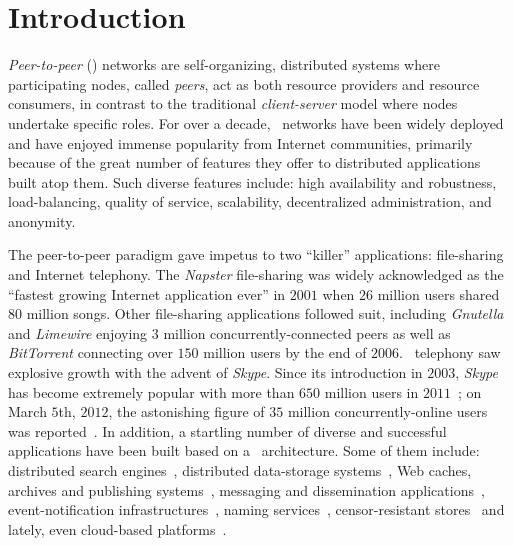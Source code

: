 \section{Introduction}
\label{section:intro}

\emph{Peer-to-peer} (\p) networks are self-organizing, distributed systems where
participating nodes, called \emph{peers}, act as both resource providers and
resource consumers, in contrast to the traditional \emph{client-server} model
where nodes undertake specific roles.
For over a decade, \p\ networks have been widely deployed and have
enjoyed immense popularity from Internet communities, primarily because
of the great number of features they offer to distributed applications 
built atop them. 
Such diverse features include:  high availability and robustness,
load-balancing, quality of service, scalability, decentralized administration,
and anonymity. 

The peer-to-peer paradigm gave impetus to two ``killer'' applications:
file-sharing and Internet telephony.
The {\sl Napster} file-sharing was widely acknowledged as the 
``fastest growing Internet application ever'' in $2001$ when
$26$ million users shared $80$ million songs.
Other file-sharing applications followed suit, 
including {\sl Gnutella} and {\sl Limewire} enjoying $3$ 
million concurrently-connected peers as well as 
{\sl BitTorrent} connecting over $150$ million users by the end of $2006$.
\p\ telephony saw explosive growth with the advent of {\sl Skype}.
Since its introduction in $2003$,
{\sl Skype} has become extremely popular with more than $650$ million users 
in $2011$~\cite{skypetotalusers}; on March $5$th, $2012$,  
the astonishing figure of $35$ million concurrently-online users  
was reported~\cite{skypesymusers}.
In addition, a startling number of diverse and successful
applications have been built based on a \p\ architecture. 
Some of them include:
distributed search engines~\cite{yaci}, 
distributed data-storage systems~\cite{kbc_oceanstore_2000,bdet_fsdfs_2000,dkkms_cfs_2001,dr_pastutility_2001,abc_farsite_2002,mmfc_ivy_2002,arla,agebh_dks_2003},
Web caches, archives and publishing systems~\cite{ird_squirrel_2002,bags_youserv_2002,wrc_publius_2000,wm_tangler_2001},
messaging and dissemination applications~\cite{threedegrees,icpp08-pd}, 
event-notification infrastructures~\cite{rkcd_scribe_2001,cdkr_scribe_2002,agebh_dks_2003}, 
naming services~\cite{cmm_chorddns_2002}, 
censor-resistant stores~\cite{cswh_freenet_2001} and
lately, even cloud-based platforms~\cite{mgpj_cloudsnap_2011}.


